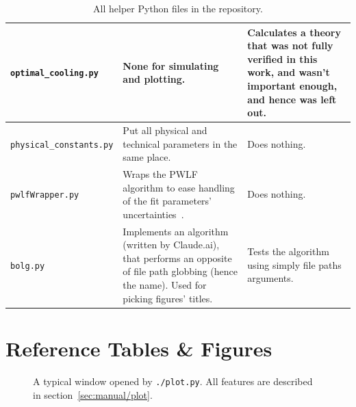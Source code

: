 \begin{table}
\begin{tabularx}{\textwidth}{l|X|X}
\hline
\texttt{optimal\_cooling.py}    & None for simulating and plotting.                                                                                                                      & Calculates a theory that was not fully verified in this work, and wasn't important enough, and hence was left out.                                                                                                                                                                                               \\
\hline
\texttt{physical\_constants.py} & Put all physical and technical parameters in the same place.                                                                                           & Does nothing.                                                                                                                                                                                                                                        \\
\hline
\texttt{pwlfWrapper.py}         & Wraps the PWLF algorithm to ease handling of the fit parameters' uncertainties~\cite{uncertainties}.                                                                        & Does nothing.                                                                                                                                                                                                                                        \\
\hline
\texttt{bolg.py}                & Implements an algorithm (written by Claude.ai), that performs an opposite of file path globbing (hence the name). Used for picking figures' titles.    & Tests the algorithm using simply file paths arguments.                                                                                                                                                                                               \\
\end{tabularx}
\caption{All helper Python files in the repository.}
\label{tbl:helper-scripts}
\end{table}

\clearpage
\section{Reference Tables \& Figures}



\begin{figure}
	\begin{center}
	\end{center}
	\caption{A typical window opened by \texttt{./plot.py}. All features are described in section~\ref{sec:manual/plot}.}
	\label{fig:software-plot-example}
\end{figure}

